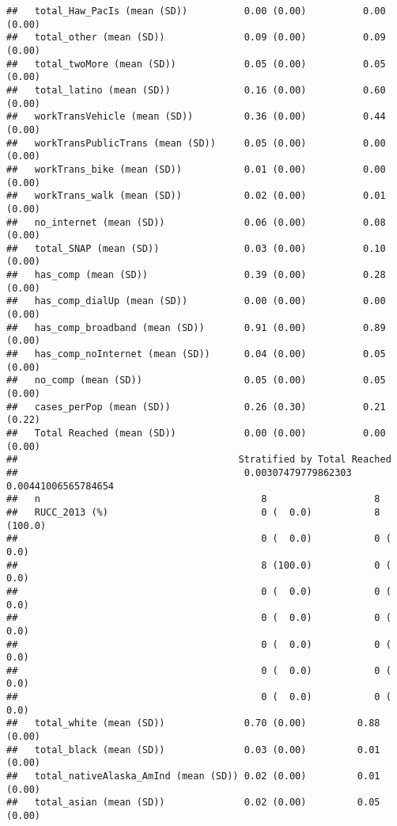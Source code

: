 \documentclass[
]{article}
\begin{document}
\begin{verbatim}
##   total_Haw_PacIs (mean (SD))          0.00 (0.00)          0.00 (0.00)        
##   total_other (mean (SD))              0.09 (0.00)          0.09 (0.00)        
##   total_twoMore (mean (SD))            0.05 (0.00)          0.05 (0.00)        
##   total_latino (mean (SD))             0.16 (0.00)          0.60 (0.00)        
##   workTransVehicle (mean (SD))         0.36 (0.00)          0.44 (0.00)        
##   workTransPublicTrans (mean (SD))     0.05 (0.00)          0.00 (0.00)        
##   workTrans_bike (mean (SD))           0.01 (0.00)          0.00 (0.00)        
##   workTrans_walk (mean (SD))           0.02 (0.00)          0.01 (0.00)        
##   no_internet (mean (SD))              0.06 (0.00)          0.08 (0.00)        
##   total_SNAP (mean (SD))               0.03 (0.00)          0.10 (0.00)        
##   has_comp (mean (SD))                 0.39 (0.00)          0.28 (0.00)        
##   has_comp_dialUp (mean (SD))          0.00 (0.00)          0.00 (0.00)        
##   has_comp_broadband (mean (SD))       0.91 (0.00)          0.89 (0.00)        
##   has_comp_noInternet (mean (SD))      0.04 (0.00)          0.05 (0.00)        
##   no_comp (mean (SD))                  0.05 (0.00)          0.05 (0.00)        
##   cases_perPop (mean (SD))             0.26 (0.30)          0.21 (0.22)        
##   Total Reached (mean (SD))            0.00 (0.00)          0.00 (0.00)        
##                                       Stratified by Total Reached
##                                        0.00307479779862303 0.00441006565784654
##   n                                       8                   8               
##   RUCC_2013 (%)                           0 (  0.0)           8 (100.0)       
##                                           0 (  0.0)           0 (  0.0)       
##                                           8 (100.0)           0 (  0.0)       
##                                           0 (  0.0)           0 (  0.0)       
##                                           0 (  0.0)           0 (  0.0)       
##                                           0 (  0.0)           0 (  0.0)       
##                                           0 (  0.0)           0 (  0.0)       
##                                           0 (  0.0)           0 (  0.0)       
##   total_white (mean (SD))              0.70 (0.00)         0.88 (0.00)        
##   total_black (mean (SD))              0.03 (0.00)         0.01 (0.00)        
##   total_nativeAlaska_AmInd (mean (SD)) 0.02 (0.00)         0.01 (0.00)        
##   total_asian (mean (SD))              0.02 (0.00)         0.05 (0.00)        

\end{verbatim}
\end{document}
